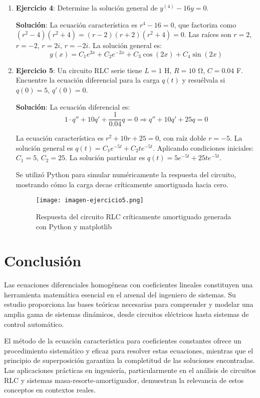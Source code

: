 \documentclass[12pt,a4paper]{article}
\begin{document}
\begin{enumerate}
    \item \textbf{Ejercicio 4}: Determine la solución general de $y^{(4)} - 16y = 0$.
    
    \textbf{Solución}: La ecuación característica es $r^4 - 16 = 0$, que factoriza como $(r^2 - 4)(r^2 + 4) = (r-2)(r+2)(r^2+4) = 0$. Las raíces son $r = 2$, $r = -2$, $r = 2i$, $r = -2i$. La solución general es:
    $$y(x) = C_1 e^{2x} + C_2 e^{-2x} + C_3 \cos(2x) + C_4 \sin(2x)$$
    
    \item \textbf{Ejercicio 5}: Un circuito RLC serie tiene $L = 1$ H, $R = 10$ Ω, $C = 0.04$ F. Encuentre la ecuación diferencial para la carga $q(t)$ y resuélvala si $q(0) = 5$, $q'(0) = 0$.
    
    \textbf{Solución}: La ecuación diferencial es:
    $$1 \cdot q'' + 10 q' + \frac{1}{0.04} q = 0 \Rightarrow q'' + 10q' + 25q = 0$$
    
    La ecuación característica es $r^2 + 10r + 25 = 0$, con raíz doble $r = -5$. La solución general es $q(t) = C_1 e^{-5t} + C_2 t e^{-5t}$. Aplicando condiciones iniciales: $C_1 = 5$, $C_2 = 25$. La solución particular es $q(t) = 5e^{-5t} + 25t e^{-5t}$.
    
    Se utilizó Python para simular numéricamente la respuesta del circuito, mostrando cómo la carga decae críticamente amortiguada hacia cero.
    
    \begin{figure}[h]
        \centering
        \texttt{[image: imagen-ejercicio5.png]}
        \caption{Respuesta del circuito RLC críticamente amortiguado generada con Python y matplotlib}
        \label{fig:ej5}
    \end{figure}
\end{enumerate}

\section{Conclusión}

Las ecuaciones diferenciales homogéneas con coeficientes lineales constituyen una herramienta matemática esencial en el arsenal del ingeniero de sistemas. Su estudio proporciona las bases teóricas necesarias para comprender y modelar una amplia gama de sistemas dinámicos, desde circuitos eléctricos hasta sistemas de control automático.

El método de la ecuación característica para coeficientes constantes ofrece un procedimiento sistemático y eficaz para resolver estas ecuaciones, mientras que el principio de superposición garantiza la completitud de las soluciones encontradas. Las aplicaciones prácticas en ingeniería, particularmente en el análisis de circuitos RLC y sistemas masa-resorte-amortiguador, demuestran la relevancia de estos conceptos en contextos reales.
\end{document}

